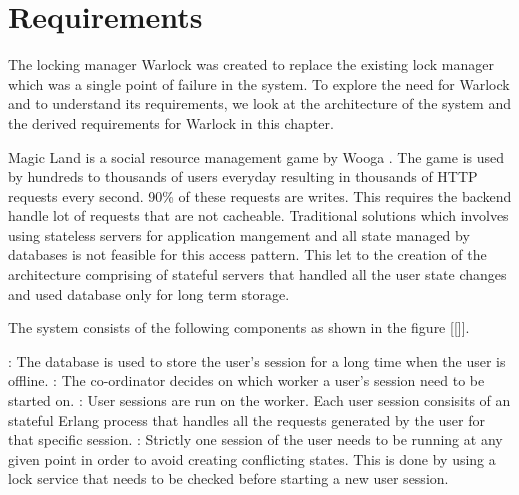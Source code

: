 \chapter{Requirements}
\label{chapter:requirements}

The locking manager Warlock was created to replace the existing lock manager
which was a single point of failure in the system. To explore the need for
Warlock and to understand its requirements, we look at the architecture of
the system and the derived requirements for Warlock in this chapter.

Magic Land \citep{magicland} is a social%
resource management game by Wooga%
. The game is used by hundreds to thousands of users everyday resulting in
thousands of HTTP requests every second. 90\% of these requests are writes.
This requires the backend%
handle lot of requests that are not cacheable. Traditional solutions which
involves using stateless servers for application mangement and all state managed
by databases is not feasible for this access pattern. This let to the creation
of the architecture comprising of stateful servers that handled all the user
state changes and used database only for long term storage.

The system consists of the following components as shown in the figure [[]].

\begin{itemize}
    : The database is used to store the user's session for
    a long time when the user is offline.
    : The co-ordinator decides on which worker a user's 
    session need to be started on.
    : User sessions are run on the worker. Each user session 
    consisits of an stateful Erlang process that handles all the requests
    generated by the user for that specific session.
    : Strictly one session of the user needs to be running at
    any given point in order to avoid creating conflicting states. This is
    done by using a lock service that needs to be checked before starting
    a new user session.
\end{itemize}

